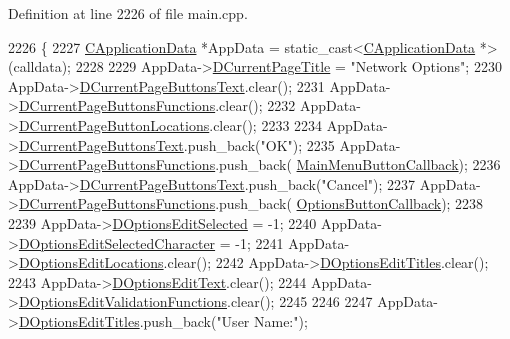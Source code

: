 Definition at line 2226 of file main.\+cpp.


\begin{DoxyCode}
2226                                                                  \{
2227     \hyperlink{classCApplicationData}{CApplicationData} *AppData = \textcolor{keyword}{static\_cast<}\hyperlink{classCApplicationData}{CApplicationData} *\textcolor{keyword}{>}(calldata);
2228 
2229     AppData->\hyperlink{classCApplicationData_a49ce7f0b5891f0f2c29b73aad636b761}{DCurrentPageTitle} = \textcolor{stringliteral}{"Network Options"};
2230     AppData->\hyperlink{classCApplicationData_af04b7f5f8ba4e5c99c0a3530055fc15d}{DCurrentPageButtonsText}.clear();
2231     AppData->\hyperlink{classCApplicationData_ad3079e5563a19d21c1e4ceff2a188382}{DCurrentPageButtonsFunctions}.clear();
2232     AppData->\hyperlink{classCApplicationData_a3615df8e23cea3ce17f11cf61340a7b4}{DCurrentPageButtonLocations}.clear();
2233     
2234     AppData->\hyperlink{classCApplicationData_af04b7f5f8ba4e5c99c0a3530055fc15d}{DCurrentPageButtonsText}.push\_back(\textcolor{stringliteral}{"OK"});
2235     AppData->\hyperlink{classCApplicationData_ad3079e5563a19d21c1e4ceff2a188382}{DCurrentPageButtonsFunctions}.push\_back(
      \hyperlink{classCApplicationData_a4410839118b5b74dab798ad7be6f703b}{MainMenuButtonCallback});
2236     AppData->\hyperlink{classCApplicationData_af04b7f5f8ba4e5c99c0a3530055fc15d}{DCurrentPageButtonsText}.push\_back(\textcolor{stringliteral}{"Cancel"});
2237     AppData->\hyperlink{classCApplicationData_ad3079e5563a19d21c1e4ceff2a188382}{DCurrentPageButtonsFunctions}.push\_back(
      \hyperlink{classCApplicationData_a3647cf78eb59689b901d4204c81555b4}{OptionsButtonCallback});
2238     
2239     AppData->\hyperlink{classCApplicationData_aee4aa5eb5b89b86eb2648d0f9c7358f9}{DOptionsEditSelected} = -1;
2240     AppData->\hyperlink{classCApplicationData_a921d69021fc61e51d12d8a26a5ac1a89}{DOptionsEditSelectedCharacter} = -1;
2241     AppData->\hyperlink{classCApplicationData_ab4e6804c6e50cca45ab3c3071588da34}{DOptionsEditLocations}.clear();
2242     AppData->\hyperlink{classCApplicationData_a7a322ef6b8c1db3e995c6b493230fd05}{DOptionsEditTitles}.clear();
2243     AppData->\hyperlink{classCApplicationData_a7044dc34cbd9d6776e8ef79eb12b5ce4}{DOptionsEditText}.clear();
2244     AppData->\hyperlink{classCApplicationData_ab76fa444142de66fdb058f390e01112c}{DOptionsEditValidationFunctions}.clear();
2245     
2246     
2247     AppData->\hyperlink{classCApplicationData_a7a322ef6b8c1db3e995c6b493230fd05}{DOptionsEditTitles}.push\_back(\textcolor{stringliteral}{"User Name:"});

\end{DoxyCode}
